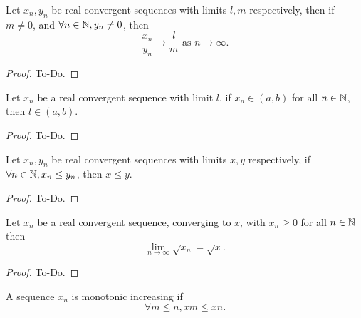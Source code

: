 \begin{theorem}\label{thm:seq_COLT_ratio}
    Let $x_n, y_n$ be real convergent sequences with limits $l, m$ respectively,
    then if $m \neq 0$,
    and $\forall n \in \mathbb{N}, y_n \neq 0$,
    then
    \[
    \frac{x_n}{y_n} \to \frac{l}{m} \text{ as } n \to \infty.
    \]
\end{theorem}
\begin{proof}
    To-Do.
\end{proof}

\begin{theorem}\label{thm:seq_limit_in_interval}
     \leanok
    Let $x_n$ be a real convergent sequence with limit $l$,
    if $x_n \in (a, b)$ for all $n \in \mathbb{N}$,
    then $l \in (a, b)$.
\end{theorem}
\begin{proof}
    To-Do.
\end{proof}

\begin{lemma}\label{lem:seq_limineq}
    Let $x_n, y_n$ be real convergent sequences with limits $x, y$ respectively,
    if $\forall n \in \mathbb{N}, x_n \leq y_n$,
    then $x \leq y$.
\end{lemma}
\begin{proof}
    To-Do.
\end{proof}

\begin{theorem}\label{thm:seq_cor}
    Let $x_n$ be a real convergent sequence,
    converging to $x$,
    with $x_n \geq 0$ for all $n \in \mathbb{N}$ then
    \[
    \lim_{n \to \infty} \sqrt{x_n} = \sqrt{x}.
    \]
\end{theorem}
\begin{proof}
    To-Do.
\end{proof}

\begin{definition}\label{def:seqmonoinc}
     \leanok
    A sequence $x_n$ is monotonic increasing if
    \[
    \forall m \leq n, x m \leq x n.
    \]
\end{definition}

